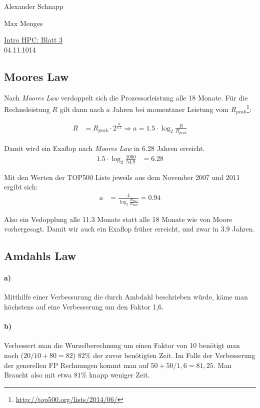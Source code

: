 \documentclass[a4paper,11pt]{scrartcl}
\begin{document}
\hfill Alexander Schnapp

\hfill Max Menges

\begin{center}
\underline{\Huge{Intro HPC: Blatt 3}}\\
\large{04.11.1014}\\
\end{center}


\subsection{Moores Law}
Nach \emph{Moores Law} verdoppelt sich die Prozessorleistung alle 18 Monate. Für die Rechneleistung $R$ gilt dann nach $a$ Jahren bei momentaner Leistung vom $R_{peak}$\footnote{\url{http://top500.org/lists/2014/06/}}:

\begin{align*}
R&=R_{peak}\cdot 2^{\frac{a}{1.5}} \Rightarrow a = 1.5\cdot \log_2{\frac{R}{R_{peak}}}
\end{align*}

Damit wird ein Exaflop nach \emph{Moores Law} in 6.28 Jahren erreicht.
\begin{align*}
1.5\cdot \log_2{\frac{1000}{54.9}}&=6.28
\end{align*}

Mit den Werten der TOP500 Liste jeweils aus dem November 2007 und 2011 ergibt sich:
\begin{align*}
    a&= \frac{4}{\log_2{\frac{R_{2011}}{R_{2007}}}}=0.94
\end{align*}

Also ein Vedopplung alle 11.3 Monate statt alle 18 Monate wie von Moore vorhergesagt. Damit wir auch ein Exaflop früher erreicht, und zwar in 3.9 Jahren.\\

\subsection{Amdahls Law}
\paragraph*{a)} Mitthilfe einer Verbessurung die durch Ambdahl beschrieben würde, käme man höchstens auf eine Verbesserung um den Faktor 1,6.
\paragraph*{b)}Verbessert man die Wurzelberechnung um einen Faktor von 10 benötigt man noch ($20/10+80=82$) $82\%$ der zuvor benötigten Zeit. Im Falle der Verbesserung der generellen FP Rechnungen kommt man auf $50+50/1,6=81,25$. Man Braucht also mit etwa $81\%$ knapp weniger Zeit.
\end{document}
